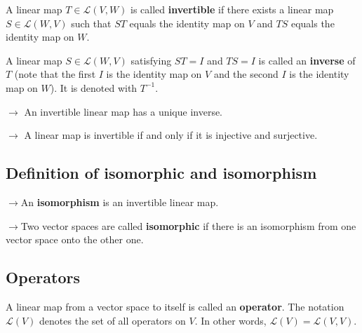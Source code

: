 \documentclass{article}
\begin{document}
\parindent=0pt A linear map $T \in \mathcal{L}(V, W)$ is called \textbf{invertible} if there exists a linear map $S \in \mathcal{L}(W, V)$ such that $S T$ equals the identity map on $V$ and $T S$ equals the identity map on $W$.
\vspace{6pt}

A linear map $S \in \mathcal{L}(W, V)$ satisfying $ST= I$ and $T S = I$ is called an \textbf{inverse} of $T$ (note that the ﬁrst $I$ is the identity map on $V$ and the second $I$ is the identity map on $W$). It is denoted with $T^{-1}$.
\vspace{8pt}

$\rightarrow$ An invertible linear map has a unique inverse.
\vspace{4pt}

$\rightarrow$ A linear map is invertible if and only if it is injective and surjective.

\subsection{Definition of isomorphic and isomorphism}
$\rightarrow$An \textbf{isomorphism} is an invertible linear map.

$\rightarrow$Two vector spaces are called \textbf{isomorphic} if there is an isomorphism from one vector space onto the other one.

\subsection{Operators}
A linear map from a vector space to itself is called an \textbf{operator}.
The notation $\mathcal{L}(V)$ denotes the set of all operators on $V$. In other words, $\mathcal{L}(V) = \mathcal{L}(V, V)$.
\end{document}
